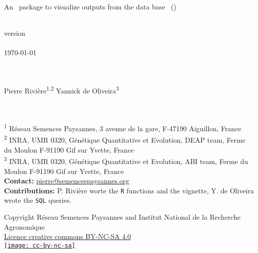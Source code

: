 \begin{center}
\Huge{\pack } \\
\Large{An \R~package to visualize outputs from the data base \BDfull~(\BD)}

~\\

version \versionnumber \\

~\\
\today

~\\~\\

Pierre Rivi\`ere\textsuperscript{1,2} \hspace{1cm} Yannick de Oliveira\textsuperscript{3} \\
~\\~\\ 
\end{center}


\noindent\textsuperscript{1} R\'eseau Semences Paysannes, 3 avenue de la gare, F-47190 Aiguillon, France \\ 
\textsuperscript{2} INRA, UMR 0320, Génétique Quantitative et Evolution, DEAP team, Ferme du Moulon F-91190 Gif sur Yvette, France \\
\textsuperscript{3} INRA, UMR 0320, Génétique Quantitative et Evolution, ABI team, Ferme du Moulon F-91190 Gif sur Yvette, France \\
\textbf{Contact:} \href{mailto:pierre@semencespaysannes.org}{pierre@semencespaysannes.org} \\
\textbf{Contributions:} 
P. Rivière worte the \texttt{R} functions and the vignette,
Y. de Oliveira wrote the \texttt{SQL} queries.

\vfill

\begin{center}
Copyright Réseau Semences Paysannes and Institut National de la Recherche Agronomique \\
\href{http://creativecommons.org/licenses/by-nc-sa/4.0/}{Licence creative commons BY-NC-SA 4.0} \\
\vspace{.25cm}
\href{http://creativecommons.org/licenses/by-nc-sa/4.0/}{\texttt{[image: cc-by-nc-sa]}}
\end{center}

\vfill


